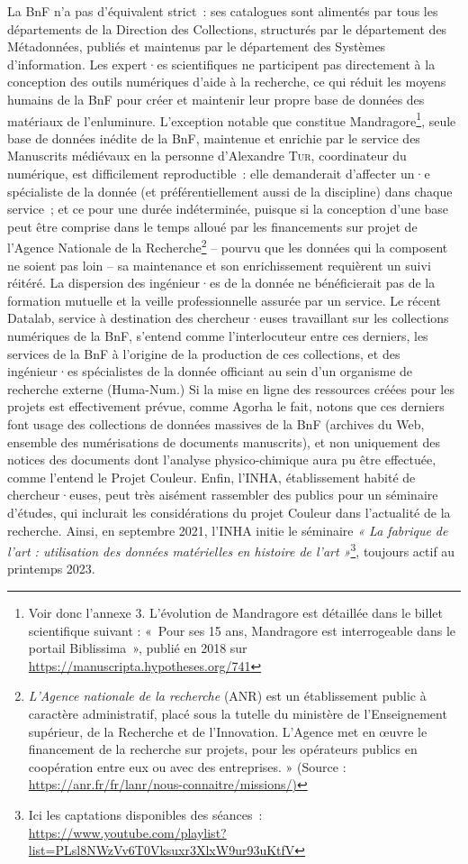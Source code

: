 \documentclass[a4paper,12pt, twoside]{book}
\begin{document}
La BnF n’a pas d’équivalent strict~: ses catalogues sont alimentés par tous les départements de la Direction des Collections, structurés par le département des Métadonnées, publiés et maintenus par le département des Systèmes d’information. Les expert·es scientifiques ne participent pas directement à la conception des outils numériques d’aide à la recherche, ce qui réduit les moyens humains de la BnF pour créer et maintenir leur propre base de données des matériaux de l’enluminure. L’exception notable que constitue Mandragore\footnote{Voir donc l’annexe 3. L’évolution de Mandragore est détaillée dans le billet scientifique suivant : «~Pour ses 15 ans, Mandragore est interrogeable dans le portail Biblissima~», publié en 2018 sur \url{https://manuscripta.hypotheses.org/741}}, seule base de données inédite de la BnF, maintenue et enrichie par le service des Manuscrits médiévaux en la personne d’Alexandre \textsc{Tur}, coordinateur du numérique, est difficilement reproductible~: elle demanderait d’affecter un·e spécialiste de la donnée (et préférentiellement aussi de la discipline) dans chaque service~; et ce pour une durée indéterminée, puisque si la conception d’une base peut être comprise dans le temps alloué par les financements sur projet de l’Agence Nationale de la Recherche\footnote{\emph{L'Agence nationale de la recherche} (ANR) est un établissement public à caractère administratif, placé sous la tutelle du ministère de l'Enseignement supérieur, de la Recherche et de l'Innovation. L'Agence met en œuvre le financement de la recherche sur projets, pour les opérateurs publics en coopération entre eux ou avec des entreprises. » (Source : \url{https://anr.fr/fr/lanr/nous-connaitre/missions/)}} -- pourvu que les données qui la composent ne soient pas loin --  sa maintenance et son enrichissement requièrent un suivi réitéré. La dispersion des ingénieur·es de la donnée ne bénéficierait pas de la formation mutuelle et la veille professionnelle assurée par un service. Le récent Datalab, service à destination des chercheur·euses travaillant sur les collections numériques de la BnF, s’entend comme l’interlocuteur entre ces derniers, les services de la BnF à l’origine de la production de ces collections, et des ingénieur·es spécialistes de la donnée officiant au sein d’un organisme de recherche externe (Huma-Num.) Si la mise en ligne des ressources créées pour les projets est effectivement prévue, comme Agorha le fait, notons que ces derniers font usage des collections de données massives de la BnF (archives du Web, ensemble des numérisations de documents manuscrits), et non uniquement des notices des documents dont l’analyse physico-chimique aura pu être effectuée, comme l’entend le Projet Couleur. Enfin, l’INHA, établissement habité de chercheur·euses, peut très aisément rassembler des publics pour un séminaire d’études, qui inclurait les considérations du projet Couleur dans l’actualité de la recherche. Ainsi, en septembre 2021, l’INHA initie le séminaire \textit{« La fabrique de l'art : utilisation des données matérielles en histoire de l'art »}\footnote{Ici les captations disponibles des séances~: \url{https://www.youtube.com/playlist?list=PLsl8NWzVv6T0Vksuxr3XlxW9ur93uKtfV}}, toujours actif au printemps 2023.
\end{document}
